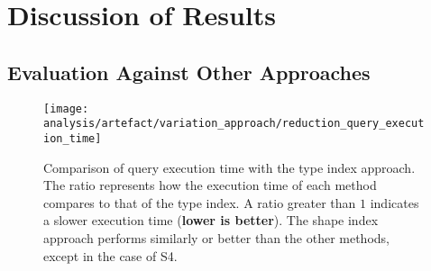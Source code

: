 \section{Discussion of Results}\label{sec:result}
    
\subsection{Evaluation Against Other Approaches}

\begin{figure*}
    \centering
    \texttt{[image: analysis/artefact/variation\_approach/reduction\_query\_execution\_time]}
    \caption{
    Comparison of query execution time with the type index approach.
    The ratio represents how the execution time of each method compares to that of the type index. 
    A ratio greater than $1$ indicates a slower execution time (\textbf{lower is better}).
    The shape index approach performs similarly or better than the other methods, except in the case of S4.
    }
    \label{fig:compApproach}
\end{figure*}

